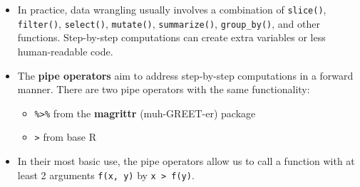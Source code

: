 \documentclass[
  letterpaper,
  DIV=11,
  numbers=noendperiod]{scrreprt}
\providecommand{\tightlist}{%
  \setlength{\itemsep}{0pt}\setlength{\parskip}{0pt}}\usepackage{longtable,booktabs,array}
\begin{document}
\begin{itemize}
\item
  In practice, data wrangling usually involves a combination of
  \texttt{slice()}, \texttt{filter()}, \texttt{select()},
  \texttt{mutate()}, \texttt{summarize()}, \texttt{group\_by()}, and
  other functions. Step-by-step computations can create extra variables
  or less human-readable code.
\item
  The \textbf{pipe operators} aim to address step-by-step computations
  in a forward manner. There are two pipe operators with the same
  functionality:

  \begin{itemize}
  \tightlist
  \item
    \texttt{\%\textgreater{}\%} from the \textbf{magrittr}
    (muh-GREET-er) package
  \item
    \texttt{\textbar{}\textgreater{}} from base R
  \end{itemize}
\item
  In their most basic use, the pipe operators allow us to call a
  function with at least 2 arguments \texttt{f(x,\ y)} by
  \texttt{x\ \textbar{}\textgreater{}\ f(y)}.
\end{itemize}
\end{document}
